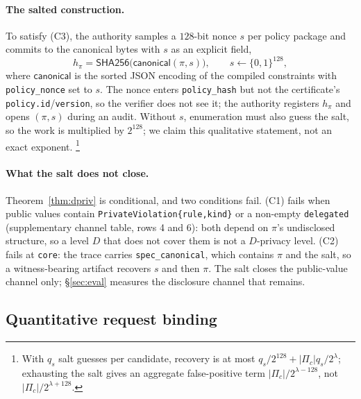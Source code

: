 \documentclass[10pt,journal,compsoc]{IEEEtran}
\begin{document}
\paragraph{The salted construction.} To satisfy (C3), the authority samples a
$128$-bit nonce $s$ per policy package and commits to the canonical bytes with
$s$ as an explicit field,
\[
h_\pi=\mathsf{SHA256}\bigl(\mathsf{canonical}(\pi,s)\bigr),\qquad
s\leftarrow\{0,1\}^{128},
\]
where $\mathsf{canonical}$ is the sorted JSON encoding of the compiled
constraints with \texttt{policy\_nonce} set to $s$. The nonce enters
\texttt{policy\_hash} but not the certificate's \texttt{policy.id}/\texttt{version},
so the verifier does not see it; the authority registers $h_\pi$ and opens
$(\pi,s)$ during an audit. Without $s$, enumeration must also guess the salt, so
the work is multiplied by $2^{128}$; we claim this qualitative statement, not an
exact exponent.%
\footnote{With $q_s$ salt guesses per candidate, recovery is at most
$q_s/2^{128}+|\Pi_c|q_s/2^{\lambda}$; exhausting the salt gives an aggregate
false-positive term $|\Pi_c|/2^{\lambda-128}$, not $|\Pi_c|/2^{\lambda+128}$.}

\paragraph{What the salt does not close.} Theorem~\ref{thm:dpriv} is
conditional, and two conditions fail. (C1) fails when public values contain
\texttt{PrivateViolation\{rule,kind\}} or a non-empty \texttt{delegated}
(supplementary channel table, rows 4 and 6): both depend on $\pi$'s undisclosed
structure, so a level $D$ that does not cover them is not a $D$-privacy level.
(C2) fails at \texttt{core}: the trace carries \texttt{spec\_canonical}, which
contains $\pi$ and the salt, so a witness-bearing artifact recovers $s$ and then
$\pi$. The salt closes the public-value channel only; \S\ref{sec:eval} measures
the disclosure channel that remains.

\subsection{Quantitative request binding}
\label{sec:t3}
\end{document}
